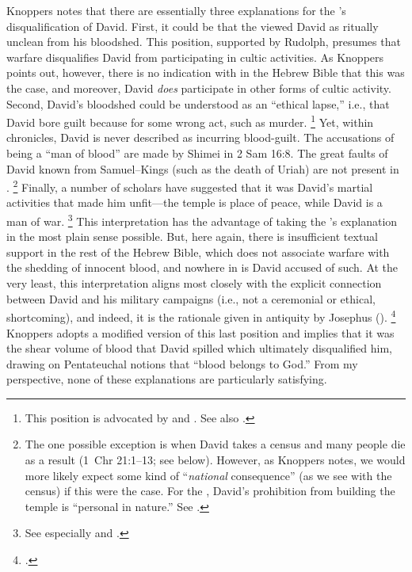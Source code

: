 Knoppers notes that there are essentially three explanations for the \chronicler's disqualification of David. First, it could be that the \chronicler viewed David as ritually unclean from his bloodshed. This position, supported by Rudolph,\autocite[151]{rudolph1955} presumes that warfare disqualifies David from participating in cultic activities. As Knoppers points out, however, there is no indication with in the Hebrew Bible that this was the case, and moreover, David \emph{does} participate in other forms of cultic activity.\autocite[772]{knoppers2007} Second, David's bloodshed could be understood as an ``ethical lapse,'' i.e., that David bore guilt because for some wrong act, such as murder.%
    \footnote{This position is advocated by \cite[53]{dirksen_jsot1996} and \cite{kelly_jsot1998}. See also \cite{braun_jbl1976}.}
Yet, within chronicles, David is never described as incurring blood-guilt. The accusations of being a ``man of blood'' are made by Shimei in 2 Sam 16:8. The great faults of David known from Samuel--Kings (such as the death of Uriah) are not present in \chronicles.%
    \footnote{The one possible exception is when David takes a census and many people die as a result (1~Chr 21:1--13; see below). However, as Knoppers notes, we would more likely expect some kind of ``\emph{national} consequence'' (as we see with the census) if this were the case. For the \chronicler, David's prohibition from building the temple is ``personal in nature.'' See \cite[772--773]{knoppers2007}.}
Finally, a number of scholars have suggested that it was David's martial activities that made him unfit---the temple is place of peace, while David is a man of war.%
    \footnote{See especially \cite[396--397]{japhet1993} and \cite{mckenzie_graham-etal1999}.}
This interpretation has the advantage of taking the \chronicler's explanation in the most plain sense possible. But, here again, there is insufficient textual support in the rest of the Hebrew Bible, which does not associate warfare with the shedding of innocent blood, and nowhere in \chronicles is David accused of such. At the very least, this interpretation aligns most closely with the explicit connection between David and his military campaigns (i.e., not a ceremonial or ethical, shortcoming), and indeed, it is the rationale given in antiquity by Josephus ().%
    \footnote{\cite[773]{knoppers2007}.}
Knoppers adopts a modified version of this last position and implies that it was the shear volume of blood that David spilled which ultimately disqualified him, drawing on Pentateuchal notions that ``blood belongs to God.''\autocite[774]{knoppers2007} From my perspective, none of these explanations are particularly satisfying. 

